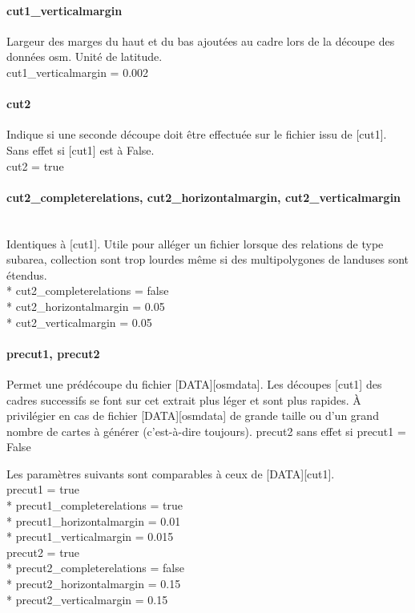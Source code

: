 \documentclass[12pt,french]{article}
\begin{document}
\paragraph{cut1\_verticalmargin} Largeur des marges du haut et du bas ajoutées au cadre lors de la découpe des données osm. Unité de latitude.\\
cut1\_verticalmargin = 0.002

\paragraph{cut2} Indique si une seconde découpe doit être effectuée sur le fichier issu de [cut1]. Sans effet si [cut1] est à False.\\
cut2 = true
\paragraph{cut2\_completerelations, cut2\_horizontalmargin, cut2\_verticalmargin} \mbox{}\\Identiques à [cut1]. Utile pour alléger un fichier lorsque des relations de type subarea, collection sont trop lourdes même si des multipolygones de landuses sont étendus.\\*
cut2\_completerelations = false\\*
cut2\_horizontalmargin = 0.05\\*
cut2\_verticalmargin = 0.05

\paragraph{precut1, precut2} Permet une prédécoupe du fichier [DATA][osmdata]. Les découpes [cut1] des cadres successifs se font sur cet extrait plus léger et sont plus rapides. À privilégier en cas de fichier [DATA][osmdata] de grande taille ou d'un grand nombre de cartes à générer (c'est-à-dire toujours). precut2 sans effet si \mbox{precut1} = False\par 
Les paramètres suivants sont comparables à ceux de [DATA][cut1].\\
precut1 = true\\*
precut1\_completerelations = true\\*
precut1\_horizontalmargin = 0.01\\*
precut1\_verticalmargin = 0.015\\
precut2 = true\\*
precut2\_completerelations = false\\*
precut2\_horizontalmargin = 0.15\\*
precut2\_verticalmargin = 0.15
\end{document}
